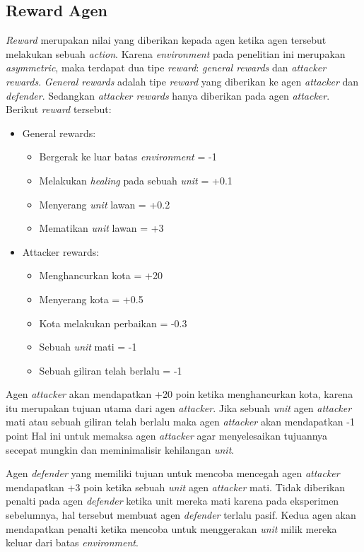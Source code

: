 \subsection{Reward Agen}
\emph{Reward} merupakan nilai yang diberikan kepada agen ketika agen tersebut melakukan sebuah \emph{action}.
Karena \emph{environment} pada penelitian ini merupakan \emph{asymmetric}, maka terdapat dua tipe \emph{reward}:
\emph{general rewards} dan \emph{attacker rewards}. 
\emph{General rewards} adalah tipe \emph{reward} yang diberikan ke agen \emph{attacker} dan \emph{defender}.
Sedangkan \emph{attacker rewards} hanya diberikan pada agen \emph{attacker}.
Berikut \emph{reward} tersebut:
\begin{itemize}
  \item General rewards: \begin{itemize}
      \item Bergerak ke luar batas \emph{environment} = -1
      \item Melakukan \emph{healing} pada sebuah \emph{unit} = +0.1
      \item Menyerang \emph{unit} lawan = +0.2
      \item Mematikan \emph{unit} lawan = +3
  \end{itemize}
  \item Attacker rewards: \begin{itemize}
      \item Menghancurkan kota = +20
      \item Menyerang kota = +0.5
      \item Kota melakukan perbaikan = -0.3
      \item Sebuah \emph{unit} mati = -1
      \item Sebuah giliran telah berlalu = -1
  \end{itemize}
\end{itemize}

Agen \emph{attacker} akan mendapatkan +20 poin ketika menghancurkan kota, karena itu merupakan tujuan utama dari agen \emph{attacker}.
Jika sebuah \emph{unit} agen \emph{attacker} mati atau sebuah giliran telah berlalu maka agen \emph{attacker} akan mendapatkan -1 point
Hal ini untuk memaksa agen \emph{attacker} agar menyelesaikan tujuannya secepat mungkin dan meminimalisir kehilangan \emph{unit}.

Agen \emph{defender} yang memiliki tujuan untuk mencoba mencegah agen \emph{attacker} mendapatkan +3 poin ketika sebuah \emph{unit}
agen \emph{attacker} mati. Tidak diberikan penalti pada agen \emph{defender} ketika unit mereka mati karena pada eksperimen sebelumnya,
hal tersebut membuat agen \emph{defender} terlalu pasif. Kedua agen akan mendapatkan penalti ketika mencoba untuk menggerakan \emph{unit}
milik mereka keluar dari batas \emph{environment}.

